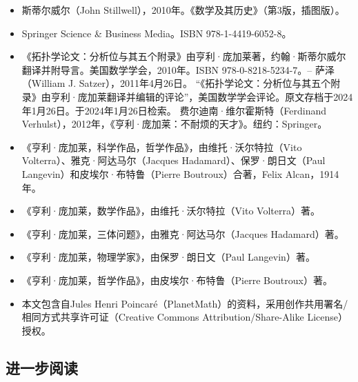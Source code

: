 \begin{itemize}
\item 斯蒂尔威尔（John Stillwell），2010年。《数学及其历史》（第3版，插图版）。\item Springer Science & Business Media。ISBN 978-1-4419-6052-8。
\item 《拓扑学论文：分析位与其五个附录》由亨利·庞加莱著，约翰·斯蒂尔威尔翻译并附导言。美国数学学会，2010年。ISBN 978-0-8218-5234-7。– 萨泽（William J. Satzer），2011年4月26日。 “《拓扑学论文：分析位与其五个附录》由亨利·庞加莱翻译并编辑的评论”，美国数学学会评论。原文存档于2024年1月26日。于2024年1月26日检索。
费尔迪南·维尔霍斯特（Ferdinand Verhulst），2012年，《亨利·庞加莱：不耐烦的天才》。纽约：Springer。
\item 《亨利·庞加莱，科学作品，哲学作品》，由维托·沃尔特拉（Vito Volterra）、雅克·阿达马尔（Jacques Hadamard）、保罗·朗日文（Paul Langevin）和皮埃尔·布特鲁（Pierre Boutroux）合著，Felix Alcan，1914年。
\item 《亨利·庞加莱，数学作品》，由维托·沃尔特拉（Vito Volterra）著。
\item 《亨利·庞加莱，三体问题》，由雅克·阿达马尔（Jacques Hadamard）著。
\item 《亨利·庞加莱，物理学家》，由保罗·朗日文（Paul Langevin）著。
\item 《亨利·庞加莱，哲学作品》，由皮埃尔·布特鲁（Pierre Boutroux）著。
\item 本文包含自Jules Henri Poincaré（PlanetMath）的资料，采用创作共用署名/相同方式共享许可证（Creative Commons Attribution/Share-Alike License）授权。
\end{itemize}
\subsection{进一步阅读}  

